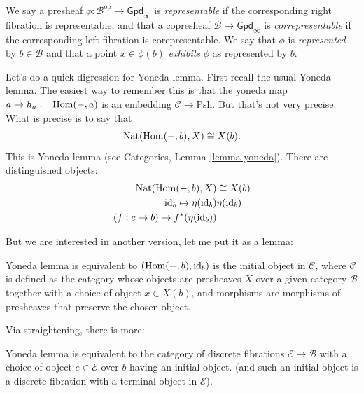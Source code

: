 \begin{definition}
\label{definition-representable-presheaf}
We say a presheaf $\phi:\mathcal{B}^{\text{op}}\to \mathsf{Gpd}_\infty$
is {\it representable} if the corresponding right fibration
is representable, and that a copresheaf
$\mathcal{B}\to \mathsf{Gpd}_\infty$ is {\it correpresentable} 
if the corresponding left fibration is corepresentable.
We say that $\phi$ is {\it represented} by $b \in \mathcal{B}$ 
and that a point $x \in \phi(b)$ {\it exhibits} $\phi$ 
as represented by $b$.
\end{definition}

\medskip\noindent
Let's do a quick digression for Yoneda lemma.
First recall the usual Yoneda lemma.
The easiest way to remember this is that
the yoneda map $a \to h_a:=\mathop{\mathrm{Hom}}\nolimits(-,a)$ is an
embedding $\mathcal{C} \to \text{Psh}$.
But that's not very precise.
What is precise is to say that
$$
\text{Nat}(\mathop{\mathrm{Hom}}\nolimits(-,b),X) \cong X(b).
$$
This is Yoneda lemma (see Categories, Lemma \ref{lemma-yoneda}).
There are distinguished objects:
\begin{align*}
\text{Nat}(\mathop{\mathrm{Hom}}\nolimits(-,b),X)&\cong X(b)\\
\text{id}_b \mapsto \eta(\text{id}_b)& \eta(\text{id}_b)\\
(f:c \to b) \mapsto f^*(\eta(\text{id}_b))&
\end{align*}

\noindent
But we are interested in another version,
let me put it as a lemma:

\begin{lemma}
\label{lemma-yoneda-equivalence-presheave-category}
Yoneda lemma is equivalent to $(\mathop{\mathrm{Hom}}\nolimits(-,b),\text{id}_b)$ is
the initial object in $\mathcal{C}$, where $\mathcal{C}$ is defined as the
category whose objects are presheaves $X$
over a given category $\mathcal{B}$ together with a
choice of object $x \in X(b)$,
and morphisms are morphisms of presheaves that preserve the
chosen object.
\end{lemma}

\noindent
Via straightening, there is more:

\begin{lemma}
\label{lemma-yoneda-equivalence-fibrations}
Yoneda lemma is equivalent
to the category of discrete fibrations $\mathcal{E} \to \mathcal{B}$ 
with a choice of object $e \in \mathcal{E}$ over $b$
having an initial object.
(and such an initial object is a discrete fibration
with a terminal object in $\mathcal{E}$).
\end{lemma}

